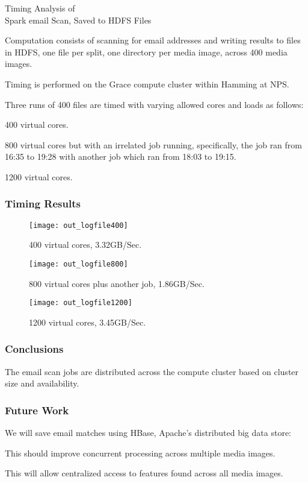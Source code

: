 \documentclass[12pt,twoside]{article}
\begin{document}
\begin{center}
\Large Timing Analysis of\\
\Large Spark email Scan, Saved to HDFS Files
\end{center}

Computation consists of scanning for email addresses and writing results to files in HDFS, one file per split, one directory per media image, across 400 media images.

Timing is performed on the Grace compute cluster within Hamming at NPS.

Three runs of 400 files are timed with varying allowed cores and loads as follows:
\begin{compactitem}
\item 400 virtual cores.
\item 800 virtual cores but with an irrelated job running, specifically, the job ran from 16:35 to 19:28 with another job which ran from 18:03 to 19:15.
\item 1200 virtual cores.
\end{compactitem}

\subsubsection* {Timing Results}

\begin{figure}[H]
  \center
  \texttt{[image: out\_logfile400]}
  \caption*{400 virtual cores, 3.32GB/Sec.}
\end{figure}

\begin{figure}[H]
  \center
  \texttt{[image: out\_logfile800]}
  \caption*{800 virtual cores plus another job, 1.86GB/Sec.}
\end{figure}

\begin{figure}[H]
  \center
  \texttt{[image: out\_logfile1200]}
  \caption*{1200 virtual cores, 3.45GB/Sec.}
\end{figure}


\subsubsection*{Conclusions}
\begin{compactitem}
\item The email scan jobs are distributed across the compute cluster based on cluster size and availability.
\end{compactitem}

\subsubsection*{Future Work}
We will save email matches using HBase, Apache's distributed big data store:
\begin{compactitem}
\item This should improve concurrent processing across multiple media images.
\item This will allow centralized access to features found across all media images.
\end{compactitem}
\end{document}
